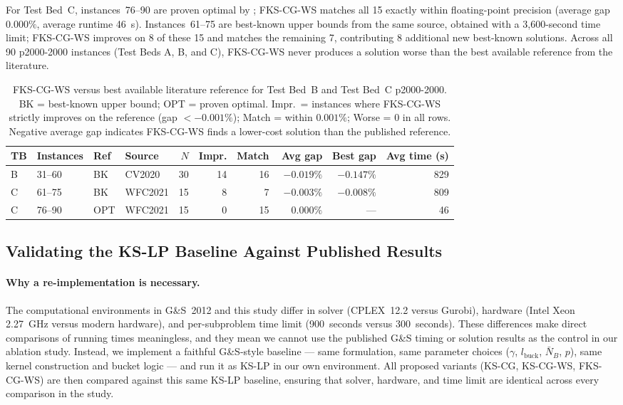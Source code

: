 For Test Bed~C, instances~76--90 are proven optimal by \citet{avella2021weakflow};
FKS-CG-WS matches all 15 exactly within floating-point precision (average gap
$0.000\%$, average runtime 46~s).
Instances~61--75 are best-known upper bounds from the same source, obtained with
a 3{,}600-second time limit; FKS-CG-WS improves on 8 of these 15 and matches
the remaining 7, contributing 8 additional new best-known solutions.
Across all 90 p2000-2000 instances (Test Beds A, B, and C), FKS-CG-WS never
produces a solution worse than the best available reference from the literature.

\begin{table}[htbp]
\centering
\caption{FKS-CG-WS versus best available literature reference for Test Bed~B and
         Test Bed~C p2000-2000.
         BK = best-known upper bound; OPT = proven optimal.
         Impr.\ = instances where FKS-CG-WS strictly improves on the reference
         (gap $< -0.001\%$); Match = within $0.001\%$; Worse = 0 in all rows.
         Negative average gap indicates FKS-CG-WS finds a lower-cost solution
         than the published reference.}
\label{tab:tbb_tbc_gap}
\footnotesize
\setlength{\tabcolsep}{4pt}
\begin{tabular}{llllrrrrrr}
\toprule
TB & Instances & Ref & Source & $N$ & Impr. & Match & Avg gap & Best gap & Avg time (s) \\
\midrule
B & 31--60 & BK  & CV2020  & 30 & 14 & 16 & $-0.019\%$ & $-0.147\%$ & 829 \\
C & 61--75 & BK  & WFC2021 & 15 &  8 &  7 & $-0.003\%$ & $-0.008\%$ & 809 \\
C & 76--90 & OPT & WFC2021 & 15 &  0 & 15 & $\phantom{-}0.000\%$ & ---        &  46 \\
\bottomrule
\end{tabular}
\end{table}

\subsection{Validating the KS-LP Baseline Against Published Results}
\label{sec:literature}

\paragraph{Why a re-implementation is necessary.}
The computational environments in G\&S~2012 and this study differ in solver
(CPLEX~12.2 versus Gurobi), hardware (Intel Xeon 2.27~GHz versus modern
hardware), and per-subproblem time limit (900~seconds versus 300~seconds).
These differences make direct comparisons of running times meaningless, and
they mean we cannot use the published G\&S timing or solution results as the
control in our ablation study.
Instead, we implement a faithful G\&S-style baseline --- same formulation, same
parameter choices ($\gamma$, $l_{\text{buck}}$, $\bar{N}_B$, $p$), same
kernel construction and bucket logic --- and run it as KS-LP in our own
environment.
All proposed variants (KS-CG, KS-CG-WS, FKS-CG-WS) are then compared against
this same KS-LP baseline, ensuring that solver, hardware, and time limit are
identical across every comparison in the study.

